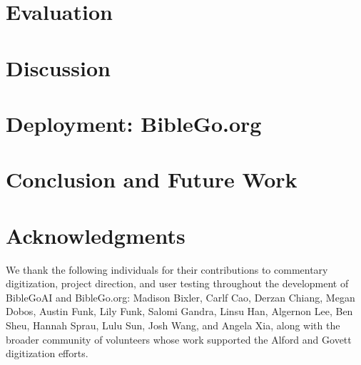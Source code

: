 \documentclass[11pt,twocolumn]{article}
\begin{document}
\section{Evaluation}
\label{sec:evaluation}


\section{Discussion}
\label{sec:discussion}


\section{Deployment: BibleGo.org}
\label{sec:platform}


\section{Conclusion and Future Work}
\label{sec:conclusion}


\section*{Acknowledgments}
We thank the following individuals for their contributions to commentary digitization, project direction, and user testing throughout the development of BibleGoAI and BibleGo.org: Madison Bixler, Carlf Cao, Derzan Chiang, Megan Dobos, Austin Funk, Lily Funk, Salomi Gandra, Linsu Han, Algernon Lee, Ben Sheu, Hannah Sprau, Lulu Sun, Josh Wang, and Angela Xia, along with the broader community of volunteers whose work supported the Alford and Govett digitization efforts.



\end{document}
